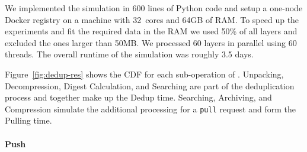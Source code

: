 We implemented the simulation in 600 lines of Python code
and setup a one-node Docker registry on a machine with 32~cores and 64GB of RAM.
%
To speed up the experiments and fit the required data in the RAM
we used 50\% of all layers and excluded the ones larger than 50MB.
%
We processed 60 layers in parallel using 60 threads.
%
The overall runtime of the simulation was roughly 3.5 days.
%

Figure~\ref{fig:dedup-res} shows the CDF for each sub-operation of
\sysname.
%
Unpacking, Decompression, Digest Calculation, and Searching 
are part of
the deduplication process and together make up the Dedup time.
%
%
Searching, Archiving, and Compression
simulate the additional processing for a \texttt{pull}
request and form the Pulling time.
%

%
%
%
%

\paragraph{Push}

